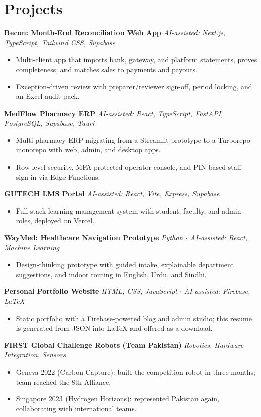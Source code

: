 \documentclass[10pt,a4paper]{article}
\newcommand{\project}[2]{%
  \textbf{#1} \hfill {\small\textit{#2}}\par}
\begin{document}
\section{Projects}
\project{Recon: Month-End Reconciliation Web App}{AI-assisted: Next.js, TypeScript, Tailwind CSS, Supabase}
  \begin{itemize}
    \item Multi-client app that imports bank, gateway, and platform statements, proves completeness, and matches sales to payments and payouts.
    \item Exception-driven review with preparer/reviewer sign-off, period locking, and an Excel audit pack.
  \end{itemize}
\project{MedFlow Pharmacy ERP}{AI-assisted: React, TypeScript, FastAPI, PostgreSQL, Supabase, Tauri}
  \begin{itemize}
    \item Multi-pharmacy ERP migrating from a Streamlit prototype to a Turborepo monorepo with web, admin, and desktop apps.
    \item Row-level security, MFA-protected operator console, and PIN-based staff sign-in via Edge Functions.
  \end{itemize}
\project{\href{https://gutech-lms-portal.vercel.app}{GUTECH LMS Portal}}{AI-assisted: React, Vite, Express, Supabase}
  \begin{itemize}
    \item Full-stack learning management system with student, faculty, and admin roles, deployed on Vercel.
  \end{itemize}
\project{WayMed: Healthcare Navigation Prototype}{Python $\cdot$ AI-assisted: React, Machine Learning}
  \begin{itemize}
    \item Design-thinking prototype with guided intake, explainable department suggestions, and indoor routing in English, Urdu, and Sindhi.
  \end{itemize}
\project{Personal Portfolio Website}{HTML, CSS, JavaScript $\cdot$ AI-assisted: Firebase, LaTeX}
  \begin{itemize}
    \item Static portfolio with a Firebase-powered blog and admin studio; this resume is generated from JSON into LaTeX and offered as a download.
  \end{itemize}
\project{FIRST Global Challenge Robots (Team Pakistan)}{Robotics, Hardware Integration, Sensors}
  \begin{itemize}
    \item Geneva 2022 (Carbon Capture): built the competition robot in three months; team reached the 8th Alliance.
    \item Singapore 2023 (Hydrogen Horizons): represented Pakistan again, collaborating with international teams.
  \end{itemize}
\end{document}
